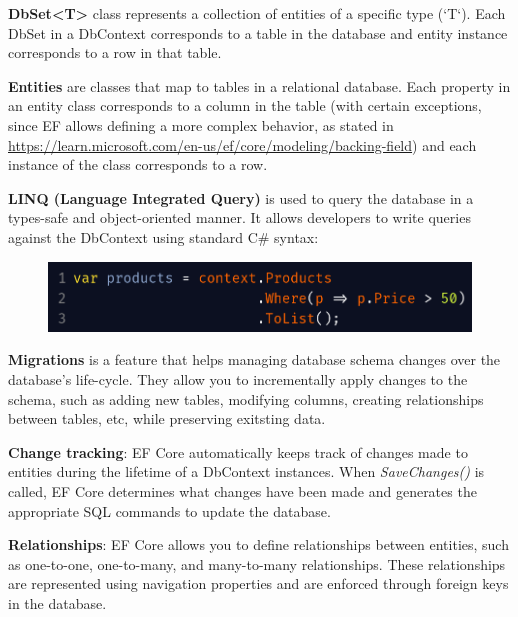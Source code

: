 \par \textbf{DbSet\textless{T}\textgreater{}} class represents a collection of entities of a specific type (`T`). Each DbSet in a DbContext corresponds to a table in the database and entity instance corresponds to a row in that table.

\begin{sloppypar} %
\par \textbf{Entities} are classes that map to tables in a relational database. Each property in an entity class corresponds to a column in the table (with certain exceptions, since EF allows defining a more complex behavior, as stated in  \url{https://learn.microsoft.com/en-us/ef/core/modeling/backing-field}) and each instance of the class corresponds to a row.
\end{sloppypar}


\par \textbf{LINQ (Language Integrated Query)} is used to query the database in a types-safe and object-oriented manner. It allows developers to write queries against the DbContext using standard C\# syntax:

\begin{figure}[!ht]
    \centering
    \includegraphics[width=1\linewidth]{linq-example.png}
\end{figure}

\par \textbf{Migrations} is a feature that helps managing database schema changes over the database's life-cycle. They allow you to incrementally apply changes to the schema, such as adding new tables, modifying columns, creating relationships between tables, etc, while preserving exitsting data.

\par \textbf{Change tracking}: EF Core automatically keeps track of changes made to entities during the lifetime of a DbContext instances. When \textit{SaveChanges()} is called, EF Core determines what changes have been made and generates the appropriate SQL commands to update the database.

\par \textbf{Relationships}: EF Core allows you to define relationships between entities, such as one-to-one, one-to-many, and many-to-many relationships. These relationships are represented using navigation properties and are enforced through foreign keys in the database.


